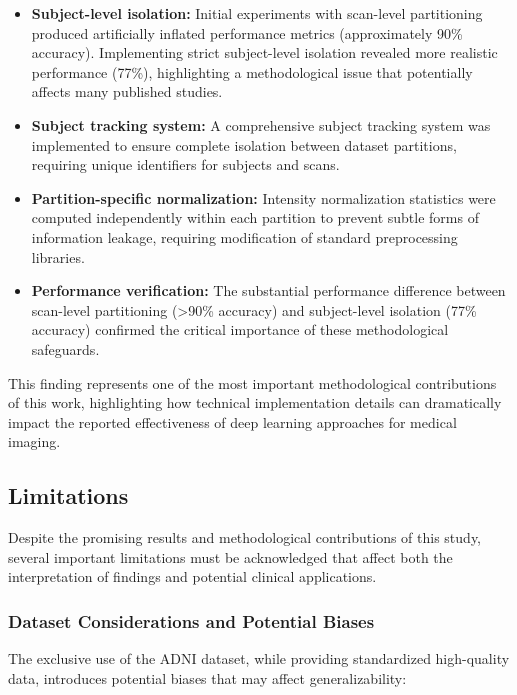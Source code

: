 \documentclass[12pt, a4paper]{article}
\begin{document}
\begin{itemize}
    \item \textbf{Subject-level isolation:} Initial experiments with scan-level partitioning produced artificially inflated performance metrics (approximately 90\% accuracy). Implementing strict subject-level isolation revealed more realistic performance (77\%), highlighting a methodological issue that potentially affects many published studies.
    
    \item \textbf{Subject tracking system:} A comprehensive subject tracking system was implemented to ensure complete isolation between dataset partitions, requiring unique identifiers for subjects and scans.
    
    \item \textbf{Partition-specific normalization:} Intensity normalization statistics were computed independently within each partition to prevent subtle forms of information leakage, requiring modification of standard preprocessing libraries.
    
    \item \textbf{Performance verification:} The substantial performance difference between scan-level partitioning (>90\% accuracy) and subject-level isolation (77\% accuracy) confirmed the critical importance of these methodological safeguards.
\end{itemize}

This finding represents one of the most important methodological contributions of this work, highlighting how technical implementation details can dramatically impact the reported effectiveness of deep learning approaches for medical imaging.

\subsection{Limitations}

Despite the promising results and methodological contributions of this study, several important limitations must be acknowledged that affect both the interpretation of findings and potential clinical applications.

\subsubsection{Dataset Considerations and Potential Biases}

The exclusive use of the ADNI dataset, while providing standardized high-quality data, introduces potential biases that may affect generalizability:
\end{document}
